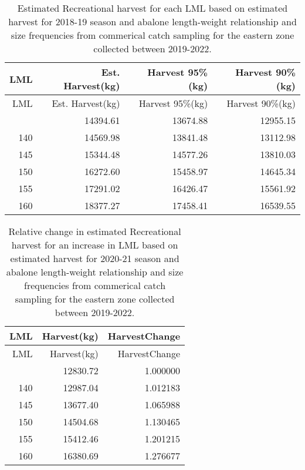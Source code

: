 \documentclass[
  11pt,
]{article}
\begin{document}
\begin{longtable}[]{@{}rrrr@{}}
\caption{Estimated Recreational harvest for each LML based on estimated
harvest for 2018-19 season and abalone length-weight relationship and
size frequencies from commerical catch sampling for the eastern zone
collected between 2019-2022.}\tabularnewline
\toprule\noalign{}
LML & Est. Harvest(kg) & Harvest 95\%(kg) & Harvest 90\%(kg) \\
\midrule\noalign{}
\endfirsthead
\toprule\noalign{}
LML & Est. Harvest(kg) & Harvest 95\%(kg) & Harvest 90\%(kg) \\
\midrule\noalign{}
\endhead
\bottomrule\noalign{}
\endlastfoot
138 & 14394.61 & 13674.88 & 12955.15 \\
140 & 14569.98 & 13841.48 & 13112.98 \\
145 & 15344.48 & 14577.26 & 13810.03 \\
150 & 16272.60 & 15458.97 & 14645.34 \\
155 & 17291.02 & 16426.47 & 15561.92 \\
160 & 18377.27 & 17458.41 & 16539.55 \\
\end{longtable}

\begin{longtable}[]{@{}rrr@{}}
\caption{Relative change in estimated Recreational harvest for an
increase in LML based on estimated harvest for 2020-21 season and
abalone length-weight relationship and size frequencies from commerical
catch sampling for the eastern zone collected between
2019-2022.}\tabularnewline
\toprule\noalign{}
LML & Harvest(kg) & HarvestChange \\
\midrule\noalign{}
\endfirsthead
\toprule\noalign{}
LML & Harvest(kg) & HarvestChange \\
\midrule\noalign{}
\endhead
\bottomrule\noalign{}
\endlastfoot
138 & 12830.72 & 1.000000 \\
140 & 12987.04 & 1.012183 \\
145 & 13677.40 & 1.065988 \\
150 & 14504.68 & 1.130465 \\
155 & 15412.46 & 1.201215 \\
160 & 16380.69 & 1.276677 \\
\end{longtable}
\end{document}
